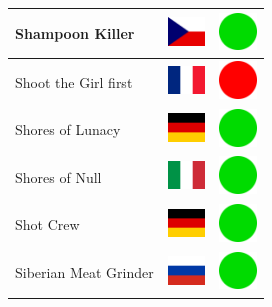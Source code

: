 \documentclass[12pt, a4paper, twoside]{report}
\begin{document}
\begin{center}
\begin{longtable}{|p{5cm}|p{2cm}|p{2cm}|}
 Shampoon Killer                                            & \includegraphics[width=1cm]{4x3/cz} &   \includegraphics[width=1cm]{likes/y} \\ \hline
 Shoot the Girl first                                       & \includegraphics[width=1cm]{4x3/fr} &   \includegraphics[width=1cm]{likes/n} \\ \hline
 Shores of Lunacy                                           & \includegraphics[width=1cm]{4x3/de} &   \includegraphics[width=1cm]{likes/y} \\ \hline
 Shores of Null                                             & \includegraphics[width=1cm]{4x3/it} &   \includegraphics[width=1cm]{likes/y} \\ \hline
 Shot Crew                                                  & \includegraphics[width=1cm]{4x3/de} &   \includegraphics[width=1cm]{likes/y} \\ \hline
 Siberian Meat Grinder                                      & \includegraphics[width=1cm]{4x3/ru} &   \includegraphics[width=1cm]{likes/y} \\ \hline

\end{longtable}
\end{center}
\end{document}
